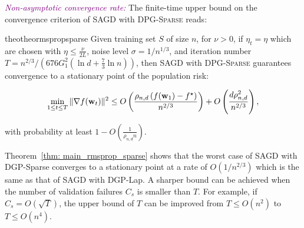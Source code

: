 \documentclass[11pt]{article}
\begin{document}
\textcolor{purple}{\textit{Non-asymptotic convergence rate:}}
The finite-time upper bound on the convergence criterion of \textsc{SAGD} with \textsc{DPG-Sparse} reads:
\begin{restatable}{theo}{theormspropsparse}
\label{thm: main_rmsprop_sparse}
 Given training set $S$ of size $n$, for $\nu >0$, if $\eta_t = \eta$ which are chosen with $\eta \leq \frac{\nu}{2L}$, noise level $\sigma = 1/n^{1/3}$, and iteration number $T = n^{2/3}/\left(676G_1^2(\ln d + \frac{7}{3}\ln n)\right)$, then \textsc{SAGD} with \textsc{DPG-Sparse}  guarantees convergence to a stationary point of the population risk:
  \begin{small}
\begin{equation*}
 \min_{1\leq t\leq T}\|\nabla f(\mathbf{w}_t)\|^2 \leq
 O \left( \frac{\rho_{n,d} \left(f(\mathbf{w}_1) - f^\star \right)}{n^{2/3}} \right) + O \left( \frac{d \rho_{n,d}^2}{n^{2/3}}\right),
\end{equation*}
\end{small}
with probability at least $1-O\left(\frac{1}{\rho_{n,d} n}\right)$.
\end{restatable} 
Theorem~\ref{thm: main_rmsprop_sparse} shows that the worst case of \textsc{SAGD} with DGP-Sparse converges to a stationary point at a rate of $O(1/n^{2/3})$ which is the same as that of \textsc{SAGD} with DGP-Lap. 
A sharper bound can be achieved when the number of validation failures $C_{s}$ is smaller than $T$. 
For example, if $C_{s} = O(\sqrt{T})$, the upper bound of $T$ can be improved from $T \leq O(n^2)$ to $T \leq O(n^4)$.
\vspace{-0.05in}
\end{document}

